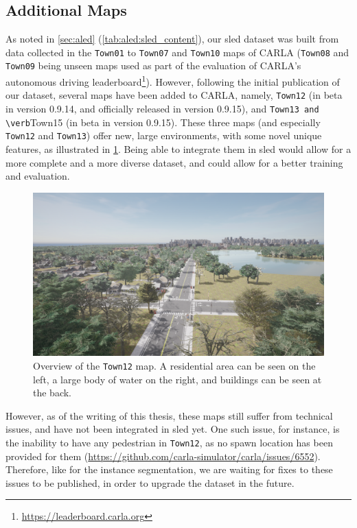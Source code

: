 \subsection{Additional Maps}
As noted in \cref{sec:aled} (\cref{tab:aled:sled_content}), our \acrshort{sled} dataset was built from data collected in the \verb|Town01| to \verb|Town07| and \verb|Town10| maps of CARLA (\verb|Town08| and \verb|Town09| being unseen maps used as part of the evaluation of CARLA's autonomous driving leaderboard\footnote{\url{https://leaderboard.carla.org}}). However, following the initial publication of our dataset, several maps have been added to CARLA, namely, \verb|Town12| (in beta in version 0.9.14, and officially released in version 0.9.15), and \verb|Town13 and \verb|Town15 (in beta in version 0.9.15). These three maps (and especially \verb|Town12| and \verb|Town13|) offer new, large environments, with some novel unique features, as illustrated in \cref{fig:appendix:carla:town12}. Being able to integrate them in \acrshort{sled} would allow for a more complete and a more diverse dataset, and could allow for a better training and evaluation.

\begin{figure}
  \centering
  \includegraphics[width=0.9\linewidth]{mainmatter/figures/a_additional_exp/carla/town12.png}
  \cprotect\caption{Overview of the \verb|Town12| map. A residential area can be seen on the left, a large body of water on the right, and buildings can be seen at the back.}\label{fig:appendix:carla:town12}
\end{figure}

However, as of the writing of this thesis, these maps still suffer from technical issues, and have not been integrated in \acrshort{sled} yet. One such issue, for instance, is the inability to have any pedestrian in \verb|Town12|, as no spawn location has been provided for them (\url{https://github.com/carla-simulator/carla/issues/6552}). Therefore, like for the instance segmentation, we are waiting for fixes to these issues to be published, in order to upgrade the dataset in the future.

